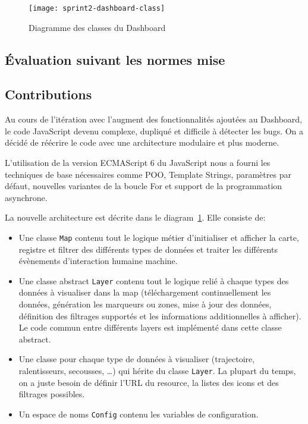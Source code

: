 \begin{figure}[htbp]
    \centering
    \texttt{[image: sprint2-dashboard-class]}
    \caption{Diagramme des classes du Dashboard}
    \label{fig:sprint2-dashboard-class}
\end{figure}

\subsection{Évaluation suivant les normes mise}


\subsection{Contributions}

Au cours de l'itération avec l'augment des fonctionnalités ajoutées au
Dashboard, le code JavaScript devenu complexe, dupliqué et difficile à détecter
les bugs. On a décidé de réécrire le code avec une architecture modulaire et
plus moderne.

L'utilisation de la version ECMAScript 6 du JavaScript nous a fourni les
techniques de base nécessaires comme POO, Template Strings, paramètres par
défaut, nouvelles variantes de la boucle For et support de la programmation
asynchrone.

La nouvelle architecture est décrite dans le
diagram~\ref{fig:sprint2-dashboard-class}. Elle consiste de:

\begin{itemize}
    \item Une classe \verb|Map| contenu tout le logique métier d'initialiser et
        afficher la carte, registre et filtrer des différents types de données
        et traiter les différents évènements d'interaction humaine machine.
    \item Une classe abstract \verb|Layer| contenu tout le logique relié à
        chaque types des données à visualiser dans la map (téléchargement
        continuellement les données, génération les marqueurs ou zones, mise à
        jour des données, définition des filtrages supportés et les
        informations additionnelles à afficher). Le code commun entre
        différents layers est implémenté dans cette classe abstract.
    \item Une classe pour chaque type de données à visualiser (trajectoire,
        ralentisseurs, secousses, \ldots) qui hérite du classe \verb|Layer|. La
        plupart du temps, on a juste besoin de définir l'URL du resource, la
        listes des icons et des filtrages possibles.
    \item Un espace de noms \verb|Config| contenu les variables de
        configuration.
\end{itemize}

